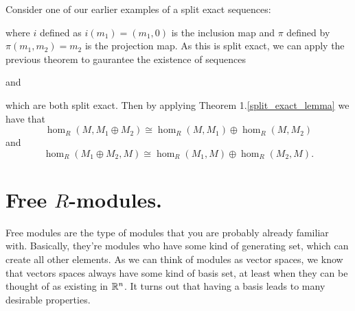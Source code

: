 \begin{prf}
    Consider one of our earlier examples of a split exact
    sequences:
    \begin{center}
    \end{center}
    where $i$ defined as $i(m_1) = (m_1, 0)$ is the inclusion map
    and $\pi$ defined by $\pi(m_1, m_2) = m_2$ is the projection
    map. As this is split exact, we can apply the previous theorem
    to gaurantee the existence of sequences 
    \begin{center}
    \end{center}
    and 
    \begin{center}
    \end{center}
    which are both split exact. Then by applying Theorem
    1.\ref{split_exact_lemma} we have that 
    \[
        \hom_R(M, M_1 \oplus M_2) \cong \hom_R(M, M_1) \oplus \hom_R(M, M_2)
    \]
    and 
    \[
        \hom_R(M_1 \oplus M_2, M) \cong \hom_R(M_1, M) \oplus \hom_R(M_2, M).
    \]
\end{prf}

\newpage
\section{Free $R$-modules.}
Free modules are the type of modules that you are probably
already familiar with. Basically, they're modules who have some
kind of generating set, which can create all other elements. As we
can think of modules as vector spaces, we know that vectors spaces
always have some kind of basis set, at least when they can be
thought of as existing in $\mathbb{R}^n$. It turns out that having a
basis leads to many desirable properties. 

